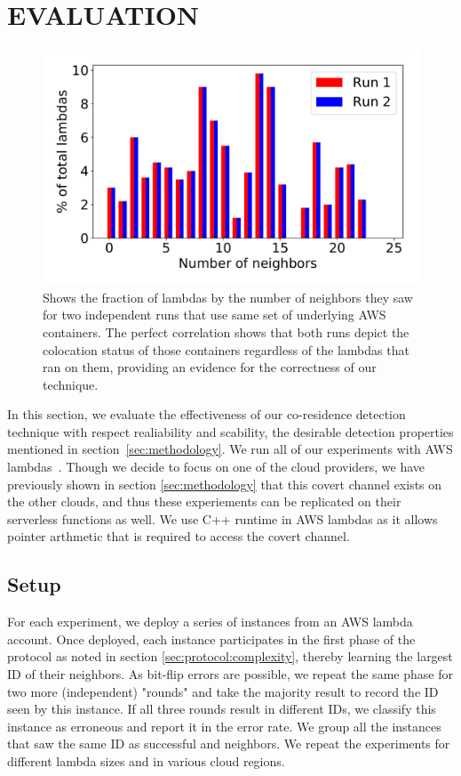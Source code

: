 \section{EVALUATION}
\label{sec:eval}

\begin{figure}[!t]
  \includegraphics[width=.99\linewidth]{fig/correlation.pdf}
  \caption{Shows the fraction of lambdas by the number of neighbors they saw for two 
  independent runs that use same set of underlying AWS containers. The perfect correlation 
  shows that both runs depict the colocation status of those containers regardless of the 
  lambdas that ran on them, providing an evidence for the correctness of our technique.
\label{fig:correlation}}
\end{figure}

In this section, we evaluate the effectiveness of our co-residence detection
technique with respect realiability and scability, the desirable detection
properties mentioned in section~\ref{sec:methodology}.  We run all of our
experiments with AWS lambdas~\cite{awscloud}. Though we decide to focus on one
of the cloud providers, we have previously shown in section \ref{sec:methodology} 
that this covert channel exists on the other clouds, and thus these experiements can be
replicated on their serverless functions as well. We use C++ runtime in AWS 
lambdas as it allows pointer arthmetic that is required to access the covert channel.

\subsection{Setup}
\label{subsec:expsetup}
For each experiment, we deploy a series of instances from an AWS lambda
account. Once deployed, each instance participates in the first phase of the
protocol as noted in section \ref{sec:protocol:complexity}, thereby learning the
largest ID of their neighbors. As bit-flip errors are possible, we repeat the
same phase for two more (independent) "rounds" and take the majority result to
record the ID seen by this instance.  If all three rounds result in different
IDs, we classify this instance as erroneous and report it in the error rate. We
group all the instances that saw the same ID as successful and neighbors. We
repeat the experiments for different lambda sizes and in various cloud regions.


